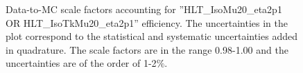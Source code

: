 \begin{figure}[htbp!]
  \begin{center}
  \end{center}
   \caption{Data-to-MC scale factors accounting for ''HLT\_IsoMu20\_eta2p1 OR HLT\_IsoTkMu20\_eta2p1'' efficiency. The uncertainties in the plot correspond to the  statistical and systematic uncertainties added in quadrature. The scale factors are in the range 0.98-1.00 and the uncertainties are of the order of 1-2$\%$.}
  \label{fig:topSFmu2}
\end{figure}


